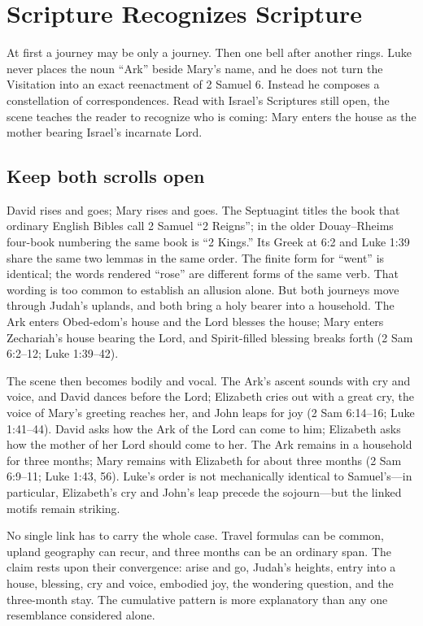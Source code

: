 \section{Scripture Recognizes Scripture}

At first a journey may be only a journey.  Then one bell after another rings.
Luke never places the noun ``Ark'' beside Mary's name, and he does not turn the
Visitation into an exact reenactment of 2 Samuel 6.  Instead he composes a
constellation of correspondences.  Read with Israel's Scriptures still open,
the scene teaches the reader to recognize who is coming: Mary enters the house
as the mother bearing Israel's incarnate Lord.

\subsection{Keep both scrolls open}

David rises and goes; Mary rises and goes.  The Septuagint titles the book
that ordinary English Bibles call 2 Samuel ``2 Reigns''; in the older
Douay--Rheims four-book numbering the same book is ``2 Kings.''  Its Greek at
6:2 and Luke 1:39 share the same two lemmas in the same order.  The finite form for
``went'' is identical; the words rendered ``rose'' are different forms of the
same verb.  That wording is too common to establish an allusion alone.  But
both journeys
move through Judah's uplands, and both bring a holy bearer into a household.
The Ark enters Obed-edom's house and the Lord blesses the house; Mary enters
Zechariah's house bearing the Lord, and Spirit-filled blessing breaks forth
(2 Sam 6:2--12; Luke 1:39--42).

The scene then becomes bodily and vocal.  The Ark's ascent sounds with cry and
voice, and David dances before the Lord; Elizabeth cries out with a great cry,
the voice of Mary's greeting reaches her, and John leaps for joy
(2 Sam 6:14--16; Luke 1:41--44).  David asks how the Ark of the Lord can come
to him; Elizabeth asks how the mother of her Lord should come to her.  The Ark
remains in a household for three months; Mary remains with Elizabeth for about
three months (2 Sam 6:9--11; Luke 1:43, 56).  Luke's order is not mechanically
identical to Samuel's---in particular, Elizabeth's cry and John's leap precede
the sojourn---but the linked motifs remain striking.

No single link has to carry the whole case.  Travel formulas can be common,
upland geography can recur, and three months can be an ordinary span.  The
claim rests upon their convergence: arise and go, Judah's heights, entry into
a house, blessing, cry and voice, embodied joy, the wondering question, and
the three-month stay.  The cumulative pattern is more explanatory than any
one resemblance considered alone.

